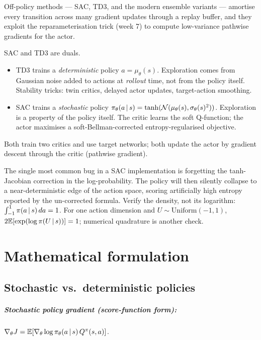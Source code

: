 \documentclass[11pt,oneside]{scrbook}
\begin{document}
 Off-policy methods --- SAC, TD3, and the modern ensemble variants --- amortise every transition across many gradient updates through a replay buffer, and they exploit the reparameterisation trick (week 7) to compute low-variance pathwise gradients for the actor.

\begin{intuition}
SAC and TD3 are duals.
\begin{itemize}[leftmargin=*]
  \item TD3 trains a \emph{deterministic} policy $a = \mu_\theta(s)$. Exploration comes from Gaussian noise added to actions at \emph{rollout} time, not from the policy itself. Stability tricks: twin critics, delayed actor updates, target-action smoothing.
  \item SAC trains a \emph{stochastic} policy $\pi_\theta(a\,\vert\, s) = \tanh(\mathcal{N}(\mu_\theta(s), \sigma_\theta(s)^2))$. Exploration is a property of the policy itself. The critic learns the soft Q-function; the actor maximises a soft-Bellman-corrected entropy-regularised objective.
\end{itemize}
Both train two critics and use target networks; both update the actor by gradient descent through the critic (pathwise gradient).
\end{intuition}

\begin{pitfall}
The single most common bug in a SAC implementation is forgetting the tanh-Jacobian correction in the log-probability. The policy will then silently collapse to a near-deterministic edge of the action space, scoring artificially high entropy reported by the un-corrected formula. Verify the density, not its logarithm: $\int_{-1}^{1}\pi(a\,\vert\, s)\,da=1$. For one action dimension and $U\sim\mathrm{Uniform}(-1,1)$, $2\mathbb{E}[\exp(\log\pi(U\,\vert\, s))]=1$; numerical quadrature is another check.
\end{pitfall}

\chapter{Mathematical formulation}

\section{Stochastic vs.\ deterministic policies}

\paragraph{Stochastic policy gradient (score-function form):}
$\nabla_\theta J = \mathbb{E}[\nabla_\theta \log \pi_\theta(a\,\vert\, s)\, Q^\pi(s,a)]$.
\end{document}
